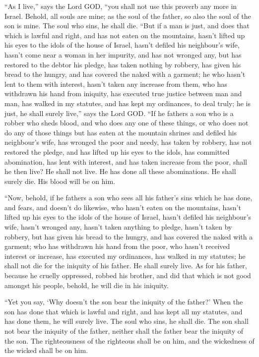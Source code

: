  ``As I live,'' says the Lord GOD, ``you shall not use this
proverb any more in Israel.  Behold, all souls are mine; as
the soul of the father, so also the soul of the son is mine. The soul
who sins, he shall die.  ``But if a man is just, and does
that which is lawful and right,  and has not eaten on the
mountains, hasn't lifted up his eyes to the idols of the house of
Israel, hasn't defiled his neighbour's wife, hasn't come near a woman in
her impurity,  and has not wronged any, but has restored to
the debtor his pledge, has taken nothing by robbery, has given his bread
to the hungry, and has covered the naked with a garment;  he
who hasn't lent to them with interest, hasn't taken any increase from
them, who has withdrawn his hand from iniquity, has executed true
justice between man and man,  has walked in my statutes, and
has kept my ordinances, to deal truly; he is just, he shall surely
live,'' says the Lord GOD.  ``If he fathers a son who is a
robber who sheds blood, and who does any one of these things,
 or who does not do any of those things but has eaten at
the mountain shrines and defiled his neighbour's wife,  has
wronged the poor and needy, has taken by robbery, has not restored the
pledge, and has lifted up his eyes to the idols, has committed
abomination,  has lent with interest, and has taken
increase from the poor, shall he then live? He shall not live. He has
done all these abominations. He shall surely die. His blood will be on
him.

 ``Now, behold, if he fathers a son who sees all his
father's sins which he has done, and fears, and doesn't do likewise,
 who hasn't eaten on the mountains, hasn't lifted up his
eyes to the idols of the house of Israel, hasn't defiled his neighbour's
wife,  hasn't wronged any, hasn't taken anything to pledge,
hasn't taken by robbery, but has given his bread to the hungry, and has
covered the naked with a garment;  who has withdrawn his
hand from the poor, who hasn't received interest or increase, has
executed my ordinances, has walked in my statutes; he shall not die for
the iniquity of his father. He shall surely live.  As for
his father, because he cruelly oppressed, robbed his brother, and did
that which is not good amongst his people, behold, he will die in his
iniquity.

 ``Yet you say, `Why doesn't the son bear the iniquity of
the father?' When the son has done that which is lawful and right, and
has kept all my statutes, and has done them, he will surely live.
 The soul who sins, he shall die. The son shall not bear
the iniquity of the father, neither shall the father bear the iniquity
of the son. The righteousness of the righteous shall be on him, and the
wickedness of the wicked shall be on him.

